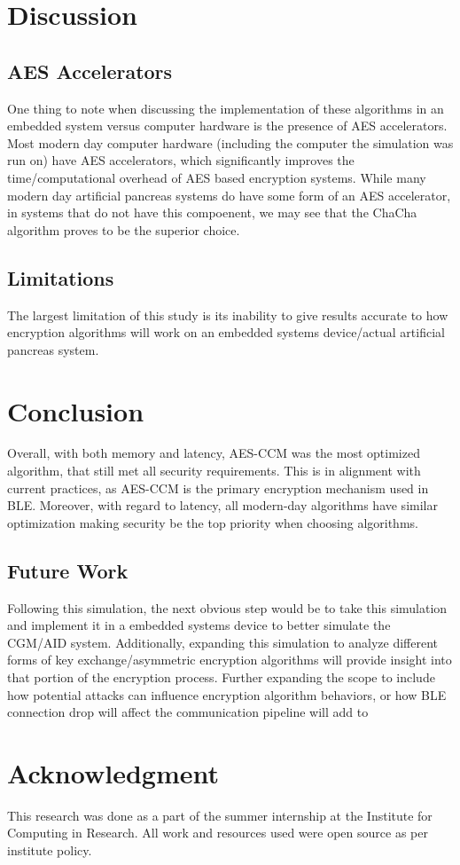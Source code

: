 \documentclass[conference]{IEEEtran}
\begin{document}
\section{Discussion}
\subsection{AES Accelerators}
One thing to note when discussing the implementation of these algorithms in an embedded system versus computer hardware is the presence of AES accelerators. Most modern day computer hardware (including the computer the simulation was run on) have AES accelerators, which significantly improves the time/computational overhead of AES based encryption systems. While many modern day artificial pancreas systems do have some form of an AES accelerator, in systems that do not have this compoenent, we may see that the ChaCha algorithm proves to be the superior choice.
\subsection{Limitations}
The largest limitation of this study is its inability to give results accurate to how encryption algorithms will work on an embedded systems device/actual artificial pancreas system. 

\section{Conclusion}
Overall, with both memory and latency, AES-CCM was the most optimized algorithm, that still met all security requirements. This is in alignment with current practices, as AES-CCM is the primary encryption mechanism used in BLE. Moreover, with regard to latency, all modern-day algorithms have similar optimization making security be the top priority when choosing algorithms. 
\vspace{.2cm}
\subsection{Future Work}
Following this simulation, the next obvious step would be to take this simulation and implement it in a embedded systems device to better simulate the CGM/AID system. Additionally, expanding this simulation to analyze different forms of key exchange/asymmetric encryption algorithms will provide insight into that portion of the encryption process. Further expanding the scope to include how potential attacks can influence encryption algorithm behaviors, or how BLE connection drop will affect the communication pipeline will add to 


\section*{Acknowledgment}

This research was done as a part of the summer internship at the Institute for Computing in Research. All work and resources used were open source as per institute policy.
\newpage

\nocite{*}

\end{document}
